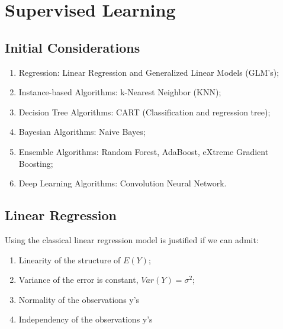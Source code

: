 
\chapter{Supervised Learning} %

\label{Chapter1} %


\newcommand{\keyword}[1]{\textbf{#1}}
\newcommand{\tabhead}[1]{\textbf{#1}}
\newcommand{\code}[1]{\texttt{#1}}
\newcommand{\file}[1]{\texttt{\bfseries#1}}
\newcommand{\option}[1]{\texttt{\itshape#1}}


\section{Initial Considerations}

\begin{enumerate}
    \item Regression: Linear Regression and Generalized Linear Models (GLM's);
    \item Instance-based Algorithms: k-Nearest Neighbor (KNN);
    \item Decision Tree Algorithms: CART (Classification and regression tree);
    \item Bayesian Algorithms: Naive Bayes;
    \item Ensemble Algorithms: Random Forest, AdaBoost, eXtreme Gradient Boosting;
    \item Deep Learning Algorithms: Convolution Neural Network.
\end{enumerate}


\section{Linear Regression}
      
    Using the classical linear regression model is justified if we can admit:
    
    \begin{enumerate}
        \item Linearity of the structure of $E(Y)$;
        \item Variance of the error is constant, $Var(Y) = \sigma^2$;
        \item Normality of the observations y's
        \item Independency of the observations y's
    \end{enumerate}
    
